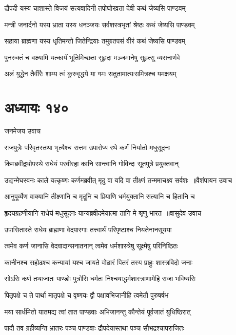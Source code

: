 \twolineshloka
{द्रौपदी यस्य चाशास्ते विजयं सत्यवादिनी}
{तपोघोरव्रता देवी कथं जेष्यसि पाण्डवम्}


\twolineshloka
{मन्त्री जनार्दनो यस्य भ्राता यस्य धनञ्जयः}
{सर्वशस्त्रभृतां श्रेष्ठः कथं जेष्यसि पाण्डवम्}


\twolineshloka
{सहाया ब्राह्मणा यस्य धृतिमन्तो जितेन्द्रियाः}
{तमुग्रतपसं वीरं कथं जेष्यसि पाण्डवम्}


\twolineshloka
{पुनरुक्तं च वक्ष्यामि यत्कार्यं भूतिमिच्छता}
{सुहृदा मञ्जमानेषु सुहृत्सु व्यसनार्णवे}


\twolineshloka
{अलं युद्धेन तैर्वीरैः शाम्य त्वं कुरुवृद्धये}
{मा गमः सतुतामात्यःसमित्रश्च यमक्षयम्}


\chapter{अध्यायः १४०}
\twolineshloka
{जनमेजय उवाच}
{}


\twolineshloka
{राजपुत्रैः परिवृतस्तथा भृत्यैश्च सत्तम}
{उपारोप्य रथे कर्णं निर्यातो मधुसूदनः}


\twolineshloka
{किमब्रवीद्रथोपस्थे राधेयं परवीरहा}
{कानि सान्त्वानि गोविन्दः सूतपुत्रे प्रयुक्तवान्}


\threelineshloka
{उद्यन्मेघस्वनः काले यत्कृष्णः कर्णमब्रवीत्}
{मृदु वा यदि वा तीक्ष्णं तन्ममाचक्ष्व सर्वशः ॥वैशंपायन उवाच}
{}


\twolineshloka
{आनुपूर्व्येण वाक्यानि तीक्ष्णानि च मृदूनि च}
{प्रियाणि धर्मयुक्तानि सत्यानि च हितानि च}


\threelineshloka
{हृदयग्रहणीयानि राधेयं मधुसूदनः}
{यान्यब्रवीदमेयात्मा तानि मे श्रृणु भारत ॥वासुदेव उवाच}
{}


\twolineshloka
{उपासितास्ते राधेय ब्राह्मणा वेदपारगाः}
{तत्त्वार्थं परिपृष्टाश्च नियतेनानसूयया}


\twolineshloka
{त्वमेव कर्ण जानासि वेदवादान्सनातनान्}
{त्वमेव धर्मशास्त्रेषु सूक्ष्मेषु परिनिष्ठितः}


\twolineshloka
{कानीनश्च सहोढश्च कन्यायां यश्च जायते}
{वोढारं पितरं तस्य प्राहुः शास्त्रविदो जनाः}


\twolineshloka
{सोऽसि कर्ण तथाजातः पाण्डोः पुत्रोसि धर्मतः}
{निश्चयाद्धर्मशास्त्राणामेहि राजा भविष्यसि}


\twolineshloka
{पितृपक्षे च ते पार्था मातृपक्षे च वृष्णयः}
{द्वौ पक्षावभिजानीहि त्वमेतौ पुरुषर्षभ}


\twolineshloka
{मया सार्धमितो यातमद्य त्वां तात पाण्डवाः}
{अभिजानन्तु कौन्तेयं पूर्वजातं युधिष्ठिरात्}


\twolineshloka
{पादौ तव ग्रहीष्यन्ति भ्रातरः पञ्च पाण्डवाः}
{द्रौपदेयास्तथा पञ्च सौभद्रश्चापराजितः}


